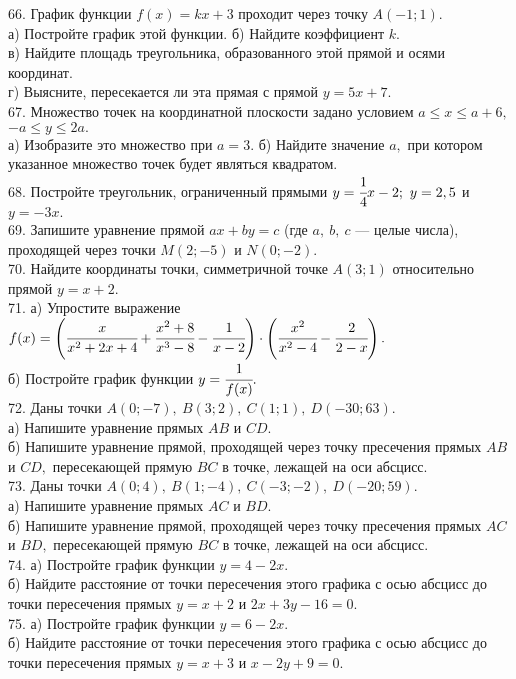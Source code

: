 66. График функции $f(x)=kx+3$ проходит через точку $A(-1;1).$\\
а) Постройте график этой функции. б) Найдите коэффициент $k.$\\
в) Найдите площадь треугольника, образованного этой прямой и осями координат.\\
г) Выясните, пересекается ли эта прямая с прямой $y=5x+7.$\\
67. Множество точек на координатной плоскости задано условием $a\le x \le a+6,$\\
$-a \le y \le 2a.$\\
а) Изобразите это множество при $a=3.$ б) Найдите значение $a,$ при котором указанное множество точек будет являться квадратом.\\
68. Постройте треугольник, ограниченный прямыми $y=\cfrac{1}{4}x-2;\ y=2,5$ и $y=-3x.$\\
69. Запишите уравнение прямой $ax+by=c$ (где $a,\ b,\ c$ --- целые числа), проходящей через точки $M(2;-5)$ и $N(0;-2).$\\
70. Найдите координаты точки, симметричной точке $A(3;1)$ относительно прямой $y=x+2.$\\
71. а) Упростите выражение $f(x)=\left(\cfrac{x}{x^2+2x+4}+\cfrac{x^2+8}{x^3-8}-\cfrac{1}{x-2}\right)\cdot\left(
\cfrac{x^2}{x^2-4}-\cfrac{2}{2-x}\right).$\\
б) Постройте график функции $y=\cfrac{1}{f(x)}.$\\
72. Даны точки $A(0;-7),\ B(3;2),\ C(1;1),\ D(-30;63).$\\
а) Напишите уравнение прямых $AB$ и $CD.$\\
б) Напишите уравнение прямой, проходящей через точку пресечения прямых $AB$ и $CD,$ пересекающей прямую $BC$ в точке, лежащей на оси абсцисс.\\
73. Даны точки $A(0;4),\ B(1;-4),\ C(-3;-2),\ D(-20;59).$\\
а) Напишите уравнение прямых $AC$ и $BD.$\\
б) Напишите уравнение прямой, проходящей через точку пресечения прямых $AC$ и $BD,$ пересекающей прямую $BC$ в точке, лежащей на оси абсцисс.\\
74. а) Постройте график функции $y=4-2x.$\\
б) Найдите расстояние от точки пересечения этого графика с осью абсцисс до точки пересечения прямых $y=x+2$ и $2x+3y-16=0.$\\
75. а) Постройте график функции $y=6-2x.$\\
б) Найдите расстояние от точки пересечения этого графика с осью абсцисс до точки пересечения прямых $y=x+3$ и $x-2y+9=0.$\\

